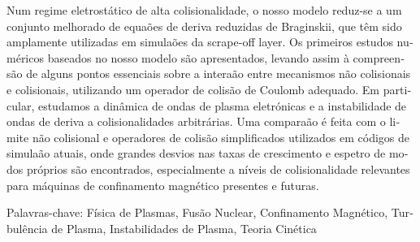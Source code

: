 \begin{otherlanguage}{portuguese}
%
Num regime eletrostático de alta colisionalidade, o nosso modelo reduz-se a um conjunto melhorado de equa{}ões de deriva reduzidas de Braginskii, que têm sido amplamente utilizadas em simula{}ões da scrape-off layer.
%
Os primeiros estudos numéricos baseados no nosso modelo são apresentados, levando assim à compreensão de alguns pontos essenciais sobre a intera{}ão entre mecanismos não colisionais e colisionais, utilizando um operador de colisão de Coulomb adequado.
%
Em particular, estudamos a dinâmica de ondas de plasma eletrónicas e a instabilidade de ondas de deriva a colisionalidades arbitrárias.
%
Uma compara{}ão é feita com o limite não colisional e operadores de colisão simplificados utilizados em códigos de simula{}ão atuais, onde grandes desvios nas taxas de crescimento e espetro de modos próprios são encontrados, especialmente a níveis de colisionalidade relevantes para máquinas de confinamento magnético presentes e futuras.

\vskip0.5cm
Palavras-chave: Física de Plasmas, Fusão Nuclear, Confinamento Magnético, Turbulência de Plasma, Instabilidades de Plasma, Teoria Cinética
\end{otherlanguage}

\endgroup			
\vfill
